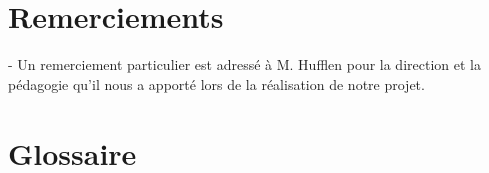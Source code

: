 \documentclass[a4paper,12pt]{report}
\begin{document}
    \newpage
    \section*{Remerciements}
    - Un remerciement particulier est adressé à M. Hufflen pour la direction et la pédagogie qu'il nous a apporté lors de la réalisation de notre projet.

    \newpage
    \tableofcontents
    \newpage


    \newpage
    \section*{Glossaire}
    \glsaddall
    \printglossaries
    \newpage

    
    
    
    
\end{document}
